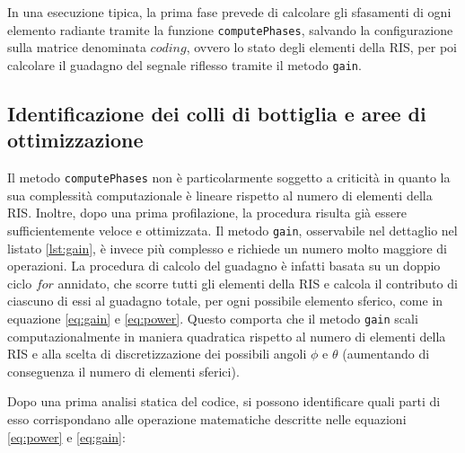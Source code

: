 In una esecuzione tipica, la prima fase prevede di calcolare gli sfasamenti di
ogni elemento radiante tramite la funzione \texttt{computePhases}, salvando la
configurazione sulla matrice denominata $coding$, ovvero lo stato degli elementi
della RIS, per poi calcolare il guadagno del segnale riflesso tramite il metodo
\texttt{gain}.

\subsection{Identificazione dei colli di bottiglia e aree di ottimizzazione}
\label{sec:ottimizzazione}

Il metodo \texttt{computePhases} non è particolarmente soggetto a criticità in quanto
la sua complessità computazionale è lineare rispetto al numero di elementi della
RIS. Inoltre, dopo una prima profilazione, la procedura risulta già essere
sufficientemente veloce e ottimizzata. Il metodo \texttt{gain}, osservabile nel dettaglio
nel listato \ref{lst:gain}, è invece più complesso e richiede un numero molto
maggiore di operazioni. La procedura di calcolo del guadagno è infatti basata su
un doppio ciclo $for$ annidato, che scorre tutti gli elementi della RIS e
calcola il contributo di ciascuno di essi al guadagno totale, per ogni possibile
elemento sferico, come in equazione \ref{eq:gain} e \ref{eq:power}. Questo comporta
che il metodo \texttt{gain} scali computazionalmente in maniera quadratica
rispetto al numero di elementi della RIS e alla scelta di discretizzazione dei
possibili angoli $\phi$ e $\theta$ (aumentando di conseguenza il numero di elementi
sferici).

\vspace{1em}

\vspace{1em}

Dopo una prima analisi statica del codice, si possono identificare quali parti
di esso corrispondano alle operazione matematiche descritte nelle equazioni
\ref{eq:power} e \ref{eq:gain}:

